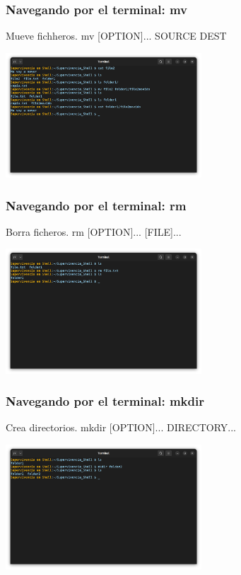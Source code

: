 \documentclass[10pt]{beamer}
\begin{document}
	\begin{frame}
		\frametitle{Navegando por el terminal: mv}
		\begin{alertblock}{Mueve fichheros.}
			mv [OPTION]... SOURCE DEST
		\end{alertblock}
		\begin{center}
			\includegraphics[width=0.55\textwidth]{mv}
		\end{center}
	\end{frame}	
		
	\begin{frame}
		\frametitle{Navegando por el terminal: rm}
		\begin{alertblock}{Borra ficheros.}
			rm [OPTION]... [FILE]...
		\end{alertblock}
		\begin{center}
			\includegraphics[width=0.55\textwidth]{rm}
		\end{center}
	\end{frame}	
		
	\begin{frame}
		\frametitle{Navegando por el terminal: mkdir}
		\begin{alertblock}{Crea directorios.}
			mkdir [OPTION]... DIRECTORY...
		\end{alertblock}
		\begin{center}
			\includegraphics[width=0.55\textwidth]{mkdir}
		\end{center}
	\end{frame}	
\end{document}
